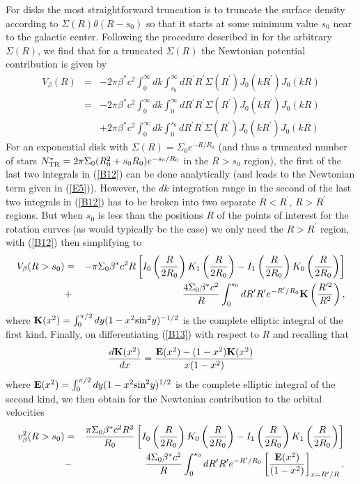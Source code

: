\documentclass[preprint,aps]{revtex4}
\begin{document}
For disks the most straightforward truncation is to truncate the surface density according to $\Sigma(R)\theta(R-s_0)$ so that it starts at some minimum value $s_0$ near to the galactic center. Following the procedure described in \cite{Mannheim2006} for the arbitrary $\Sigma(R)$, we find that for a truncated $\Sigma(R)$ the Newtonian potential contribution is given by
% 
\begin{eqnarray}
V_{\beta}(R)&=&-2 \pi \beta^* c^2\int_0^{\infty}dk\int_{s_0}^{\infty}dR^{\prime}R^{\prime}\Sigma(R^{\prime})J_0(kR^{\prime})J_0(kR)
\nonumber\\
&=&-2 \pi \beta^* c^2\int_0^{\infty}dk\int_{0}^{\infty}dR^{\prime}R^{\prime}\Sigma(R^{\prime})J_0(kR^{\prime})J_0(kR)
\nonumber\\
&&+2 \pi \beta^* c^2\int_0^{\infty}dk\int_{0}^{s_0}dR^{\prime}R^{\prime}\Sigma(R^{\prime})J_0(kR^{\prime})J_0(kR)
\label{B12}
\end{eqnarray} 
% 
For an exponential disk  with $\Sigma(R)=\Sigma_0e^{-R/R_0}$ (and thus a truncated number of stars $N^*_{\rm TR}=2\pi\Sigma_0(R_0^2+s_0R_0)e^{-s_0/R_0}$ in the $R>s_0$ region), the first of the last two integrals in (\ref{B12}) can be done analytically (and leads to the Newtonian term given in (\ref{E5})). However, the $dk$ integration range in the second of the last two integrals in (\ref{B12}) has to be broken into two separate $R<R^{\prime}$, $R>R^{\prime}$ regions. But when $s_0$ is less than the positions $R$ of the points of interest for the rotation curves (as would typically be the case) we only need the $R>R^{\prime}$ region,  with (\ref{B12}) then simplifying to
%
\begin{eqnarray}
V_{\beta}(R>s_0)&=&-\pi \Sigma_0 \beta^*c^2 R\left[I_0\left(\frac{R}{2R_0}
\right)K_1\left(\frac{R}{2R_0}\right)-
I_1\left(\frac{R}{2R_0}\right)
K_0\left(\frac{R}{2R_0}\right)\right]
\nonumber\\
&+&\frac{4 \Sigma_0\beta^* c^2}{R}\int_0^{s_0}dR^{\prime}R^{\prime}e^{-R^{\prime}/R_0}{\bf K}\left(\frac{R^{\prime 2}}{R^2}\right),
\label{B13}
\end{eqnarray} 
%
where ${\bf K}(x^2)=\int_0^{\pi/2}dy(1-x^2{\rm sin}^2y)^{-1/2}$ is the complete elliptic integral of the first kind. Finally, on differentiating (\ref{B13}) with respect to $R$ and recalling that
%
\begin{equation}
\frac{d{\bf K}(x^2)}{dx}=\frac{{\bf E}(x^2)-(1-x^2){\bf K}(x^2)}{x(1-x^2)}
\label{B14}
\end{equation}
%
where  ${\bf E}(x^2)=\int_0^{\pi/2}dy(1-x^2{\rm sin}^2y)^{1/2}$ is the complete elliptic integral of the second kind, we then obtain for the Newtonian contribution to the orbital velocities
%
\begin{eqnarray}
v^2_{\beta}(R > s_0)&=&\frac{\pi \Sigma_0 \beta^*c^2 R^2}{R_0}\left[I_0\left(\frac{R}{2R_0}
\right)K_0\left(\frac{R}{2R_0}\right)-
I_1\left(\frac{R}{2R_0}\right)
K_1\left(\frac{R}{2R_0}\right)\right]
\nonumber\\
&-&\frac{4 \Sigma_0\beta^* c^2}{R}\int_0^{s_0}dR^{\prime}R^{\prime }e^{-R^{\prime}/R_0}\left[\frac{{\bf E}(x^2)}{(1-x^2)}\right]_{x=R^{\prime }/R}.
\label{B15}
\end{eqnarray} 
%
\end{document}

